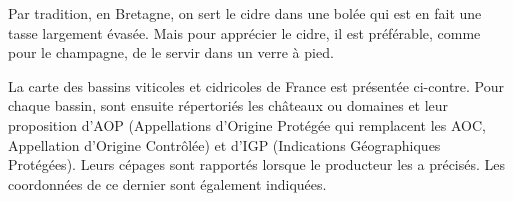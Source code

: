 Par tradition, en Bretagne, on sert le cidre dans une bolée qui est en fait une tasse largement évasée. Mais pour apprécier le cidre, il est préférable, comme pour le champagne, de le servir dans un verre à pied.
  
La carte des bassins viticoles et cidricoles de France est présentée ci-contre.
Pour chaque bassin, sont ensuite répertoriés les châteaux ou domaines et leur proposition d’AOP (Appellations d’Origine Protégée qui remplacent les AOC, Appellation d’Origine Contrôlée) et d’IGP (Indications Géographiques Protégées). Leurs cépages sont rapportés lorsque le producteur les a précisés. Les coordonnées de ce dernier sont également indiquées.     
